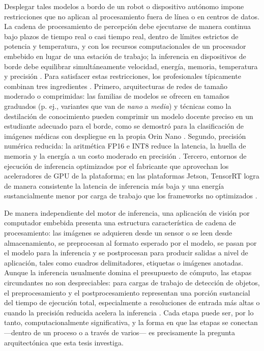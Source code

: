 Desplegar tales modelos a bordo de un robot o dispositivo autónomo impone
restricciones que no aplican al procesamiento fuera de línea o en centros de
datos. La cadena de procesamiento de percepción debe ejecutarse de manera
continua bajo plazos de tiempo real o casi tiempo real, dentro de límites
estrictos de potencia y temperatura, y con los recursos computacionales de
un procesador embebido en lugar de una estación de trabajo; la inferencia en
dispositivos de borde debe equilibrar simultáneamente velocidad, energía,
memoria, temperatura y precisión \cite{zequn2026}. Para satisfacer estas
restricciones, los profesionales típicamente combinan tres ingredientes
\cite{xu2025, szegedi2026, zequn2026}. Primero, arquitecturas de redes de
tamaño moderado o comprimidas: las familias de modelos se ofrecen en tamaños
graduados (p. ej., variantes que van de \emph{nano} a \emph{media}) y
técnicas como la destilación de conocimiento pueden comprimir un modelo
docente preciso en un estudiante adecuado para el borde, como se demostró
para la clasificación de imágenes médicas con despliegue en la propia Orin
Nano \cite{aalishah2025}. Segundo, precisión numérica reducida: la aritmética
FP16 e INT8 reduce la latencia, la huella de memoria y la energía a un costo
moderado en precisión \cite{szegedi2026, zequn2026}. Tercero, entornos de
ejecución de inferencia optimizados por el fabricante que aprovechan los
aceleradores de GPU de la plataforma; en las plataformas Jetson, TensorRT
logra de manera consistente la latencia de inferencia más baja y una energía
sustancialmente menor por carga de trabajo que los frameworks no optimizados
\cite{szegedi2026, zequn2026}.

De manera independiente del motor de inferencia, una aplicación de visión
por computador embebida presenta una estructura característica de cadena de
procesamiento: las imágenes se adquieren desde un sensor o se leen desde
almacenamiento, se preprocesan al formato esperado por el modelo, se pasan
por el modelo para la inferencia y se postprocesan para producir salidas a
nivel de aplicación, tales como cuadros delimitadores, etiquetas o imágenes
anotadas. Aunque la inferencia usualmente domina el presupuesto de cómputo,
las etapas circundantes no son despreciables: para cargas de trabajo de
detección de objetos, el preprocesamiento y el postprocesamiento representan
una porción sustancial del tiempo de ejecución total, especialmente a
resoluciones de entrada más altas o cuando la precisión reducida acelera la
inferencia \cite{szegedi2026}. Cada etapa puede ser, por lo tanto,
computacionalmente significativa, y la forma en que las etapas se
conectan---dentro de un proceso o a través de varios--- es precisamente la
pregunta arquitectónica que esta tesis investiga.


